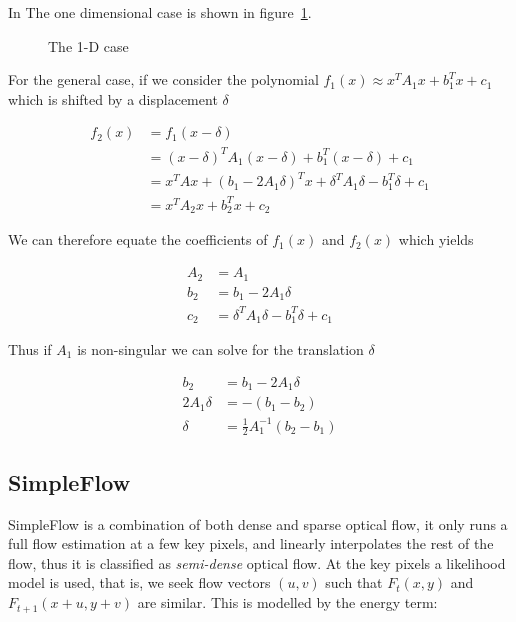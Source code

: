 \documentclass[a4paper,10pt]{article}
\begin{document}
      In The one dimensional case is shown in figure~\ref{fig:farneback}.
      
      \begin{figure}[h]
        \centering
        \caption{The 1-D case}
        \label{fig:farneback}
      \end{figure}
      
      For the general case, if we consider the polynomial $f_1(x) \approx x^TA_1x+b_1^Tx+c_1$ which is shifted by a displacement $\delta$
      
      \begin{align*}
        f_2(x) &= f_1(x-\delta) \\
               &= (x-\delta)^T A_1 (x-\delta) + b_1^T (x-\delta) + c_1 \\
               &= x^TAx + (b_1 - 2A_1\delta)^Tx + \delta^TA_1\delta -b_1^T\delta + c_1 \\
               &= x^TA_2x + b_2^Tx + c_2
      \end{align*}
      
      We can therefore equate the coefficients of $f_1(x)$ and $f_2(x)$ which yields
      
      \begin{align*}
        A_2 &= A_1 \\
        b_2 &= b_1 - 2A_1\delta \\
        c_2 &= \delta^TA_1\delta - b_1^T\delta + c_1
      \end{align*}
      
      Thus if $A_1$ is non-singular we can solve for the translation $\delta$
      
      \begin{align*}
        b_2 &= b_1 - 2A_1\delta \\
        2A_1\delta &= -(b_1-b_2) \\
        \delta &= \frac{1}{2}A_1^{-1}(b_2-b_1)
      \end{align*}
      
    \subsection{SimpleFlow}
      SimpleFlow is a combination of both dense and sparse optical flow, it only runs a full flow estimation at a few key pixels, and linearly interpolates the rest of the flow, thus it is classified as \textit{semi-dense} optical flow. At the key pixels a likelihood model is used, that is, we seek flow vectors $(u,v)$ such that $F_t(x,y)$ and $F_{t+1}(x+u,y+v)$ are similar. This is modelled by the energy term:
      
\end{document}
